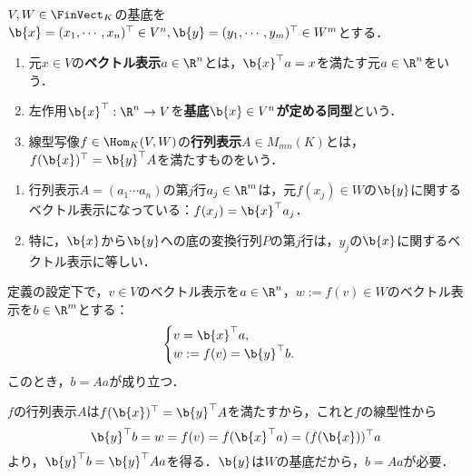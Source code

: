 \documentclass[uplatex, dvipdfmx]{jsreport}
\begin{document}
\begin{definition}
    $V,W\in\FinVect_K$の基底を$\b{x}=(x_1,\cdots,x_n)^\top\in V^n,\b{y}=(y_1,\cdots,y_m)^\top\in W^m$とする．
    \begin{enumerate}
        \item 元$x\in V$の\textbf{ベクトル表示}$a\in\R^n$とは，$\b{x}^\top a=x$を満たす元$a\in\R^n$をいう．
        \item 左作用$\b{x}^\top:\R^n\to V$を\textbf{基底$\b{x}\in V^n$が定める同型}という．
        \item 線型写像$f\in\Hom_K(V,W)$の\textbf{行列表示}$A\in M_{mn}(K)$とは，$f(\b{x})^\top=\b{y}^\top A$を満たすものをいう．
    \end{enumerate}
\end{definition}
\begin{remarks}[始基底の行き先の終基底による表示を列ベクトルとした行列]\mbox{}
    \begin{enumerate}
        \item 行列表示$A=(a_1\cdots a_n)$の第$j$行$a_j\in\R^m$は，元$f(x_j)\in W$の$\b{y}$に関するベクトル表示になっている：$f(x_j)=\b{x}^\top a_j$．
        \item 特に，$\b{x}$から$\b{y}$への底の変換行列$P$の第$j$行は，$y_j$の$\b{x}$に関するベクトル表示に等しい．
    \end{enumerate}
\end{remarks}

\begin{proposition}[線型写像と行列表示の対応]
    定義の設定下で，$v\in V$のベクトル表示を$a\in\R^n$，$w:=f(v)\in W$のベクトル表示を$b\in\R^m$とする：
    \[\begin{cases}
        v=\b{x}^\top a,\\
        w:=f(v)=\b{y}^\top b.
    \end{cases}\]
    このとき，$b=Aa$が成り立つ．
\end{proposition}
\begin{Proof}
    $f$の行列表示$A$は$f(\b{x})^\top =\b{y}^\top A$を満たすから，これと$f$の線型性から
    \[\b{y}^\top b=w=f(v)=f(\b{x}^\top a)=(f(\b{x}))^\top a\]
    より，$\b{y}^\top b=\b{y}^\top Aa$を得る．$\b{y}$は$W$の基底だから，$b=Aa$が必要．
\end{Proof}
\end{document}
